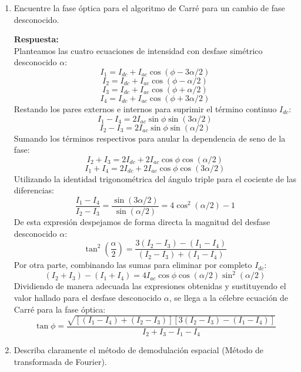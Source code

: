 \documentclass[12pt,letterpaper]{article}
\begin{document}
\begin{enumerate}
		\item[7.-] Encuentre la fase óptica para el algoritmo de Carré para un cambio de fase desconocido.
		
		\vspace{0.3cm}
		\textbf{Respuesta:} \\
		Planteamos las cuatro ecuaciones de intensidad con desfase simétrico desconocido $\alpha$:
		\[ I_1 = I_{dc} + I_{ac} \cos(\phi - 3\alpha/2) \]
		\[ I_2 = I_{dc} + I_{ac} \cos(\phi - \alpha/2) \]
		\[ I_3 = I_{dc} + I_{ac} \cos(\phi + \alpha/2) \]
		\[ I_4 = I_{dc} + I_{ac} \cos(\phi + 3\alpha/2) \]
		Restando los pares externos e internos para suprimir el término continuo $I_{dc}$:
		\[ I_1 - I_4 = 2 I_{ac} \sin\phi \sin(3\alpha/2) \]
		\[ I_2 - I_3 = 2 I_{ac} \sin\phi \sin(\alpha/2) \]
		Sumando los términos respectivos para anular la dependencia de seno de la fase:
		\[ I_2 + I_3 = 2 I_{dc} + 2 I_{ac} \cos\phi \cos(\alpha/2) \]
		\[ I_1 + I_4 = 2 I_{dc} + 2 I_{ac} \cos\phi \cos(3\alpha/2) \]
		Utilizando la identidad trigonométrica del ángulo triple para el cociente de las diferencias:
		\[ \frac{I_1 - I_4}{I_2 - I_3} = \frac{\sin(3\alpha/2)}{\sin(\alpha/2)} = 4\cos^2(\alpha/2) - 1 \]
		De esta expresión despejamos de forma directa la magnitud del desfase desconocido $\alpha$:
		\[ \tan^2\left(\frac{\alpha}{2}\right) = \frac{3(I_2 - I_3) - (I_1 - I_4)}{(I_2 - I_3) + (I_1 - I_4)} \]
		Por otra parte, combinando las sumas para eliminar por completo $I_{dc}$:
		\[ (I_2 + I_3) - (I_1 + I_4) = 4 I_{ac} \cos\phi \cos(\alpha/2) \sin^2(\alpha/2) \]
		Dividiendo de manera adecuada las expresiones obtenidas y sustituyendo el valor hallado para el desfase desconocido $\alpha$, se llega a la célebre ecuación de Carré para la fase óptica:
		\[ \tan\phi = \frac{\sqrt{[(I_1 - I_4) + (I_2 - I_3)][3(I_2 - I_3) - (I_1 - I_4)]}}{I_2 + I_3 - I_1 - I_4} \]
		\vspace{0.5cm}
		
		\item[8.-] Describa claramente el método de demodulación espacial (Método de transformada de Fourier).
		

\end{enumerate}
\end{document}
